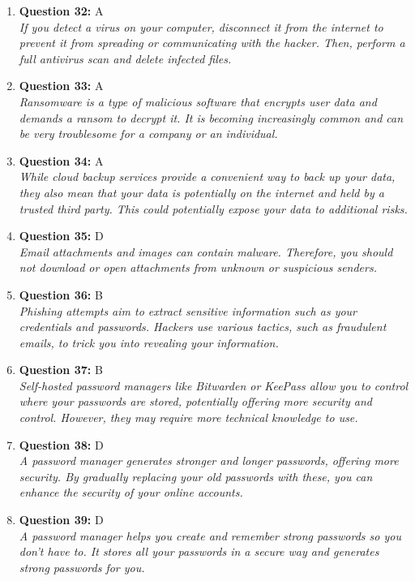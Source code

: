 \documentclass[12pt,a4paper]{article}
\begin{document}
\begin{enumerate}
\item \textbf{Question 32:} A
\\ \textit{If you detect a virus on your computer, disconnect it from the internet to prevent it from spreading or communicating with the hacker. Then, perform a full antivirus scan and delete infected files.}

\item \textbf{Question 33:} A
\\ \textit{Ransomware is a type of malicious software that encrypts user data and demands a ransom to decrypt it. It is becoming increasingly common and can be very troublesome for a company or an individual.}

\item \textbf{Question 34:} A
\\ \textit{While cloud backup services provide a convenient way to
back up your data, they also mean that your data is
potentially on the internet and held by a trusted third
party. This could potentially expose your data to
additional risks.}

\item \textbf{Question 35:} D
\\ \textit{Email attachments and images can contain malware.
Therefore, you should not download or open attachments from
unknown or suspicious senders.}

\item \textbf{Question 36:} B
\\ \textit{Phishing attempts aim to extract sensitive information such as your credentials and passwords. Hackers use various tactics, such as fraudulent emails, to trick you into revealing your information.}

\item \textbf{Question 37:} B
\\ \textit{Self-hosted password managers like Bitwarden or KeePass allow you to control where your passwords are stored, potentially offering more security and control. However, they may require more technical knowledge to use.}

\item \textbf{Question 38:} D
\\ \textit{A password manager generates stronger and longer passwords, offering more security. By gradually replacing your old passwords with these, you can enhance the security of your online accounts.}

\item \textbf{Question 39:} D
\\ \textit{A password manager helps you create and remember strong passwords so you don't have to. It stores all your passwords in a secure way and generates strong passwords for you.}


\end{enumerate}
\end{document}
